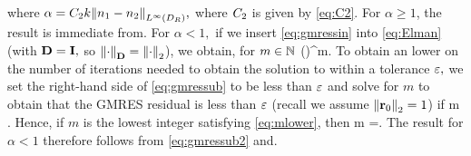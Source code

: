 where $\alpha = \Ct k \NLiDR{\no-\nt},$ where $C_{2}$ is given by \cref{eq:C2}.
\ele
{}
For $\alpha \geq 1$, the result is immediate from. For $\alpha < 1,$ if we insert \cref{eq:gmressin} into \cref{eq:Elman} (with $\mathbf{D}=\mathbf{I},$ so $\NDmat{\cdot} = \Nt{\cdot}$), we obtain, for $m \in \mathbb N$
\beq\label{eq:gmressub}
\frac{\Nt{\brm}}{\Nt{\brz}} \leq \mleft(\mright)^m.
\eeq
To obtain an lower on the number of iterations needed to obtain the solution to within a tolerance $\varepsilon,$ we set the right-hand side of \cref{eq:gmressub} to be less than $\varepsilon$ and solve for $m$ to obtain that the GMRES residual is less than $\varepsilon$ (recall we assume $\Nt{\brz} = 1$) if
\beq\label{eq:mlower}
m \geq {}.
\eeq
Hence, if $m$ is the lowest integer satisfying \cref{eq:mlower}, then
\beq\label{eq:gmressub2}
m =.
\eeq
The result for $\alpha < 1$ therefore follows from \cref{eq:gmressub2} and.
\epf


